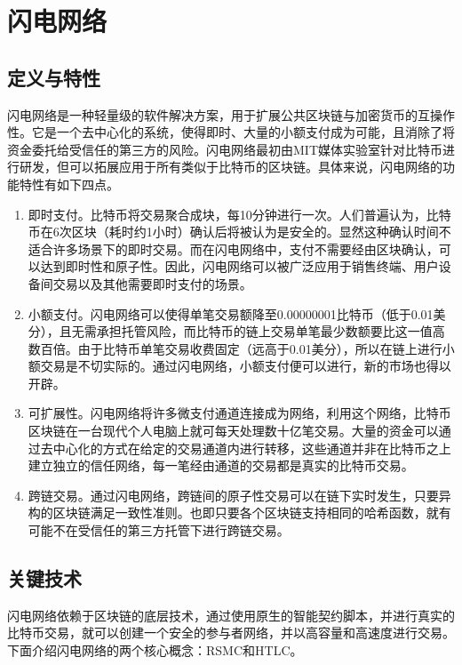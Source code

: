 \documentclass[12pt,a4paper]{article}
\begin{document}
\clearpage

\section{闪电网络}
\subsection{定义与特性}
闪电网络\cite{poon2016bitcoin}是一种轻量级的软件解决方案，用于扩展公共区块链与加密货币的互操作性。它是一个去中心化的系统，使得即时、大量的小额支付成为可能，且消除了将资金委托给受信任的第三方的风险。闪电网络最初由MIT媒体实验室针对比特币进行研发，但可以拓展应用于所有类似于比特币的区块链。具体来说，闪电网络的功能特性有如下四点。

\begin{enumerate}
	\item 即时支付。比特币将交易聚合成块，每10分钟进行一次。人们普遍认为，比特币在6次区块（耗时约1小时）确认后将被认为是安全的。显然这种确认时间不适合许多场景下的即时交易。而在闪电网络中，支付不需要经由区块确认，可以达到即时性和原子性。因此，闪电网络可以被广泛应用于销售终端、用户设备间交易以及其他需要即时支付的场景。

	\item 小额支付。闪电网络可以使得单笔交易额降至0.00000001比特币（低于0.01美分），且无需承担托管风险，而比特币的链上交易单笔最少数额要比这一值高数百倍。由于比特币单笔交易收费固定（远高于0.01美分），所以在链上进行小额交易是不切实际的。通过闪电网络，小额支付便可以进行，新的市场也得以开辟。


	\item 可扩展性。闪电网络将许多微支付通道连接成为网络，利用这个网络，比特币区块链在一台现代个人电脑上就可每天处理数十亿笔交易。大量的资金可以通过去中心化的方式在给定的交易通道内进行转移，这些通道并非在比特币之上建立独立的信任网络，每一笔经由通道的交易都是真实的比特币交易。

	\item 跨链交易。通过闪电网络，跨链间的原子性交易可以在链下实时发生，只要异构的区块链满足一致性准则。也即只要各个区块链支持相同的哈希函数，就有可能不在受信任的第三方托管下进行跨链交易。
\end{enumerate}

\subsection{关键技术}
闪电网络依赖于区块链的底层技术，通过使用原生的智能契约脚本，并进行真实的比特币交易，就可以创建一个安全的参与者网络，并以高容量和高速度进行交易。下面介绍闪电网络的两个核心概念：RSMC和HTLC。
\end{document}
